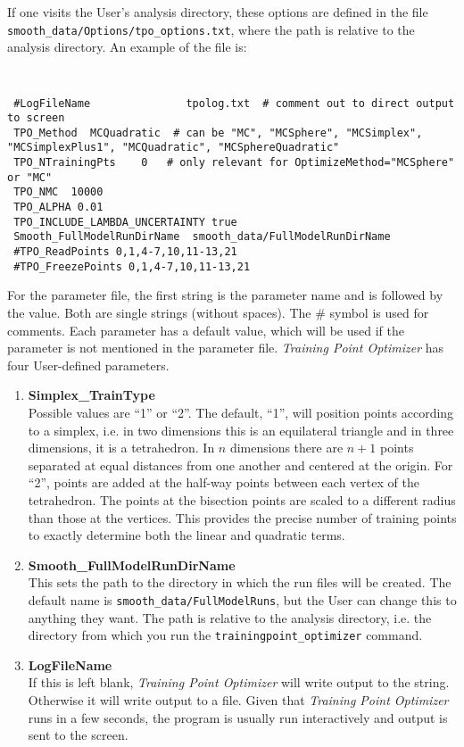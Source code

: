 \documentclass[UserManual.tex]{subfiles}
\begin{document}
If one visits the User's analysis directory, these options are defined in the file  {\tt smooth\_data/Options/tpo\_options.txt}, where the path is relative to the analysis directory. An example of the file is:
{\tt
\begin{verbatim}
 #LogFileName               tpolog.txt  # comment out to direct output to screen
 TPO_Method  MCQuadratic  # can be "MC", "MCSphere", "MCSimplex", "MCSimplexPlus1", "MCQuadratic", "MCSphereQuadratic"
 TPO_NTrainingPts    0   # only relevant for OptimizeMethod="MCSphere" or "MC"
 TPO_NMC  10000
 TPO_ALPHA 0.01
 TPO_INCLUDE_LAMBDA_UNCERTAINTY true
 Smooth_FullModelRunDirName  smooth_data/FullModelRunDirName
 #TPO_ReadPoints 0,1,4-7,10,11-13,21
 #TPO_FreezePoints 0,1,4-7,10,11-13,21
\end{verbatim}
}
For the parameter file, the first string is the parameter name and is followed by the value. Both are single strings (without spaces). The \# symbol is used for comments. Each parameter has a default value, which will be used if the parameter is not mentioned in the parameter file.  {\it Training Point Optimizer} has four User-defined parameters.
\begin{enumerate}\itemsep 0pt
    \item {\bf Simplex\_TrainType}\\
Possible values are ``1'' or ``2''. The default, ``1'', will position points according to a simplex, i.e. in two dimensions this is an equilateral triangle and in three dimensions, it is a tetrahedron. In $n$ dimensions there are $n+1$ points separated at equal distances from one another and centered at the origin. For ``2'', points are added at the half-way points between each vertex of the tetrahedron. The points at the bisection points are scaled to a different radius than those at the vertices. This provides the precise number of training points to exactly determine both the linear and quadratic terms.
\item {\bf Smooth\_FullModelRunDirName}\\
This sets the path to the directory in which the run files will be created. The default name is {\tt smooth\_data/FullModelRuns}, but the User can change this to anything they want. The path is relative to the analysis directory, i.e. the directory from which you run the {\tt trainingpoint\_optimizer} command.
\item {\bf LogFileName}\\
If this is left blank, {\it Training Point Optimizer} will write output to the string. Otherwise it will write output to a file. Given that {\it Training Point Optimizer} runs in a few seconds, the program is usually run interactively and output is sent to the screen.
\end{enumerate}
\end{document}
